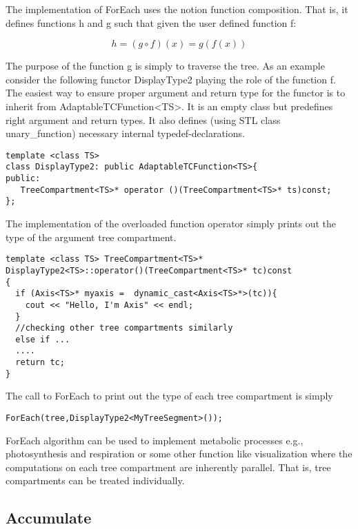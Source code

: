 The implementation of ForEach uses   the notion function  composition.
That is, it defines functions h and g such that given the user defined
function f:

\begin{displaymath}
h = (g \circ f)(x) = g(f(x))
\end{displaymath}

The purpose of  the function g is simply to traverse  the tree.  As an
example consider  the following functor DisplayType2  playing the role
of  the function  f. The  easiest way  to ensure  proper  argument and
return    type    for    the    functor    is    to    inherit    from
AdaptableTCFunction<TS>.  It  is an  empty class but  predefines right
argument  and   return  types.  It  also  defines   (using  STL  class
unary\_function) necessary internal typedef-declarations.

\begin{verbatim}
template <class TS>
class DisplayType2: public AdaptableTCFunction<TS>{
public:
   TreeCompartment<TS>* operator ()(TreeCompartment<TS>* ts)const;
};
\end{verbatim}

The  implementation  of  the  overloaded function  operator  simply
prints out the type of the argument tree compartment.

\begin{verbatim}
template <class TS> TreeCompartment<TS>* 
DisplayType2<TS>::operator()(TreeCompartment<TS>* tc)const
{
  if (Axis<TS>* myaxis =  dynamic_cast<Axis<TS>*>(tc)){
    cout << "Hello, I'm Axis" << endl;
  }
  //checking other tree compartments similarly
  else if ...  
  ....
  return tc;
}
\end{verbatim}

The call to ForEach to print out the type of each tree compartment is
simply 

\begin{verbatim}
ForEach(tree,DisplayType2<MyTreeSegment>());
\end{verbatim}

ForEach  algorithm can be used to  implement metabolic processes e.g.,
photosynthesis   and respiration     or some  other   function    like
visualization where the computations  on   each tree compartment   are
inherently parallel.  That   is,  tree  compartments can  be   treated
individually.

\subsection{Accumulate}

